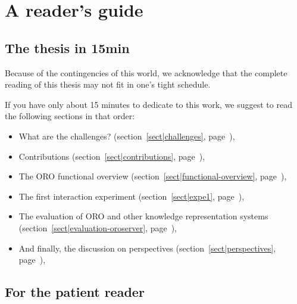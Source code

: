 

\section{A reader's guide}

\subsection*{The thesis in 15min}

Because of the contingencies of this world, we acknowledge that the complete
reading of this thesis may not fit in one's tight schedule.

If you have only about 15 minutes to dedicate to this work, we suggest to read
the following sections in that order:

\begin{itemize} \item What are the challenges? (section~\ref{sect|challenges},
            page~\pageref{sect|challenges}),

    \item Contributions (section~\ref{sect|contributions},
        page~\pageref{sect|contributions}),

    \item The ORO functional overview (section~\ref{sect|functional-overview},
        page~\pageref{sect|functional-overview}),

    \item The first interaction experiment (section~\ref{sect|expe1},
        page~\pageref{sect|expe1}),

    \item The evaluation of ORO and other knowledge representation systems
        (section~\ref{sect|evaluation-oroserver},
        page~\pageref{sect|evaluation-oroserver}),

    \item And finally, the discussion on perspectives
        (section~\ref{sect|perspectives}, page~\pageref{sect|perspectives}),

\end{itemize}


\subsection*{For the patient reader}


